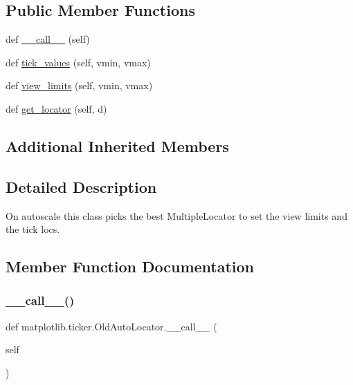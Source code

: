 \subsection*{Public Member Functions}
\begin{DoxyCompactItemize}
\item 
def \hyperlink{classmatplotlib_1_1ticker_1_1OldAutoLocator_a16a2f0b18474b2ddbda13ef4c745f884}{\+\_\+\+\_\+call\+\_\+\+\_\+} (self)
\item 
def \hyperlink{classmatplotlib_1_1ticker_1_1OldAutoLocator_aaa7cf9d2df06a76b2ea3e4a9c283bc79}{tick\+\_\+values} (self, vmin, vmax)
\item 
def \hyperlink{classmatplotlib_1_1ticker_1_1OldAutoLocator_a8d1fa64455b3ad5bead0790df6ead528}{view\+\_\+limits} (self, vmin, vmax)
\item 
def \hyperlink{classmatplotlib_1_1ticker_1_1OldAutoLocator_a90e41f1156bc3b117c537bc75d6e6661}{get\+\_\+locator} (self, d)
\end{DoxyCompactItemize}
\subsection*{Additional Inherited Members}


\subsection{Detailed Description}
\begin{DoxyVerb}On autoscale this class picks the best MultipleLocator to set the
view limits and the tick locs.
\end{DoxyVerb}
 

\subsection{Member Function Documentation}
\mbox{\label{classmatplotlib_1_1ticker_1_1OldAutoLocator_a16a2f0b18474b2ddbda13ef4c745f884}} 
\subsubsection{\texorpdfstring{\+\_\+\+\_\+call\+\_\+\+\_\+()}{\_\_call\_\_()}}
{\footnotesize\ttfamily def matplotlib.\+ticker.\+Old\+Auto\+Locator.\+\_\+\+\_\+call\+\_\+\+\_\+ (\begin{DoxyParamCaption}\item[{}]{self }\end{DoxyParamCaption})}


